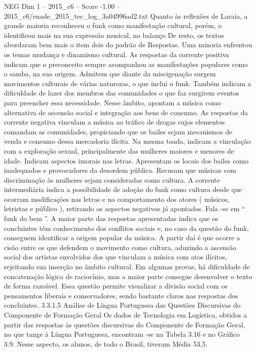 \begin{textsample}{NEG Dim 1 – 2015\_c6 – Score -1.00 – 2015\_c6/enade\_2015\_tec\_log\_3a04996ad2.txt}
Quanto às reflexões de Laraia, a grande maioria reconheceu o funk como manifestação cultural, porém, o identificou mais na sua expressão musical, no balanço De resto, os textos abordaram bem mais o item dois do padrão de Respostas.
Uma minoria enfrentou os temas mudança e dinamismo cultural.
As respostas da corrente positiva indicam que o preconceito sempre acompanhou as manifestações populares como o samba, na sua origem.
Admitem que diante da miscigenação surgem movimentos culturais de várias naturezas, o que inclui o funk.
Também indicam a dificuldade de lazer dos membros das comunidades o que faz surgirem eventos para preencher essa necessidade.
Nesse âmbito, apontam a música como alternativa de ascensão social e integração aos bens de consumo.
As respostas da corrente negativa vinculam a música ao tráfico de drogas cujos elementos comandam as comunidades, propiciando que os bailes sejam mecanismos de venda e consumo dessa mercadoria ilícita.
Na mesma toada, indicam a vinculação com a exploração sexual, principalmente das mulheres maiores e menores de idade.
Indicam aspectos imorais nas letras.
Apresentam os locais dos bailes como inadequados e provocadores da desordem pública.
Recusam que músicas com discriminação às mulheres sejam consideradas como cultura.
A corrente intermediária indica a possibilidade de adoção do funk como cultura desde que ocorram modificações nas letras e no comportamento dos atores ( músicos, letristas e público ), retirando os aspectos negativos já apontados.
Fala -se em “ funk do bem ”.
A maior parte das respostas apresentadas indica que os concluintes têm conhecimento dos conflitos sociais e, no caso da questão do funk, conseguem identificar a origem popular da música.
A partir daí é que ocorre a cisão entre os que defendem o movimento como cultura, aduzindo a ascensão social dos artistas envolvidos dos que vinculam a música com atos ilícitos, rejeitando sua inserção no âmbito cultural.
Em algumas provas, há dificuldade de concatenação lógica de raciocínio, mas a maior parte consegue desenvolver o texto de forma razoável.
Essa questão permite visualizar a divisão social com os pensamentos liberais e conservadores, sendo bastante claros nas respostas dos concluintes. 3.3.1.5 Análise de Língua Portuguesa das Questões Discursivas do Componente de Formação Geral Os dados de Tecnologia em Logística, obtidos a partir das respostas às questões discursivas do Componente de Formação Geral, no que tange à Língua Portuguesa, encontram -se na Tabela 3.16 e no Gráfico 3.9.
Nesse aspecto, os alunos, de todo o Brasil, tiveram Média 53,5.

\end{textsample}
